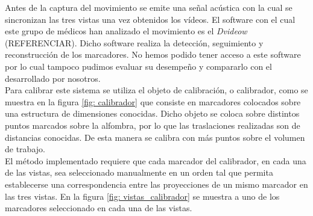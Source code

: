 Antes de la captura del movimiento se emite una señal acústica con la cual se sincronizan las tres vistas una vez obtenidos los vídeos. El software con el cual este grupo de médicos han analizado el movimiento es el \textit{Dvideow} (REFERENCIAR). Dicho software realiza la detección, seguimiento y reconstrucción de los marcadores. No hemos podido tener acceso a este software por lo cual tampoco pudimos evaluar su desempeño y compararlo con el desarrollado por nosotros.\\

Para calibrar este sistema se utiliza el objeto de calibración, o calibrador, como se muestra en la figura \ref{fig: calibrador} que consiste en marcadores colocados sobre una estructura de dimensiones conocidas. Dicho objeto se coloca sobre distintos puntos marcados sobre la alfombra, por lo que las traslaciones realizadas son de distancias conocidas. De esta manera se calibra con más puntos sobre el volumen de trabajo.\\


El método implementado requiere que cada marcador del calibrador, en cada una de las vistas, sea seleccionado manualmente en un orden tal que permita establecerse una correspondencia entre las proyecciones de un mismo marcador en las tres vistas. En la figura \ref{fig: vistas_calibrador} se muestra a uno de los marcadores seleccionado en cada una de las vistas.\\


